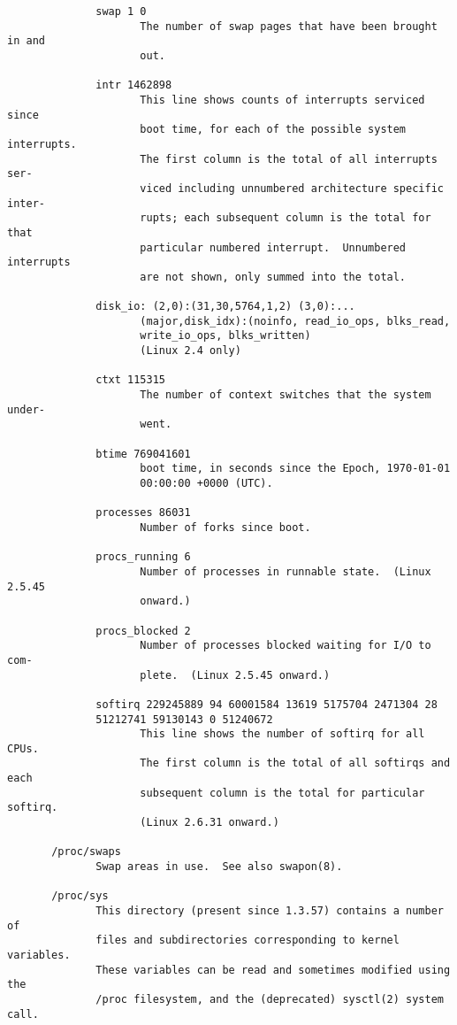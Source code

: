 \documentclass[]{article}
\begin{document}
\begin{verbatim}
              swap 1 0
                     The number of swap pages that have been brought in and
                     out.

              intr 1462898
                     This line shows counts of interrupts serviced since
                     boot time, for each of the possible system interrupts.
                     The first column is the total of all interrupts ser‐
                     viced including unnumbered architecture specific inter‐
                     rupts; each subsequent column is the total for that
                     particular numbered interrupt.  Unnumbered interrupts
                     are not shown, only summed into the total.

              disk_io: (2,0):(31,30,5764,1,2) (3,0):...
                     (major,disk_idx):(noinfo, read_io_ops, blks_read,
                     write_io_ops, blks_written)
                     (Linux 2.4 only)

              ctxt 115315
                     The number of context switches that the system under‐
                     went.

              btime 769041601
                     boot time, in seconds since the Epoch, 1970-01-01
                     00:00:00 +0000 (UTC).

              processes 86031
                     Number of forks since boot.

              procs_running 6
                     Number of processes in runnable state.  (Linux 2.5.45
                     onward.)

              procs_blocked 2
                     Number of processes blocked waiting for I/O to com‐
                     plete.  (Linux 2.5.45 onward.)

              softirq 229245889 94 60001584 13619 5175704 2471304 28
              51212741 59130143 0 51240672
                     This line shows the number of softirq for all CPUs.
                     The first column is the total of all softirqs and each
                     subsequent column is the total for particular softirq.
                     (Linux 2.6.31 onward.)

       /proc/swaps
              Swap areas in use.  See also swapon(8).

       /proc/sys
              This directory (present since 1.3.57) contains a number of
              files and subdirectories corresponding to kernel variables.
              These variables can be read and sometimes modified using the
              /proc filesystem, and the (deprecated) sysctl(2) system call.


\end{verbatim}
\end{document}
